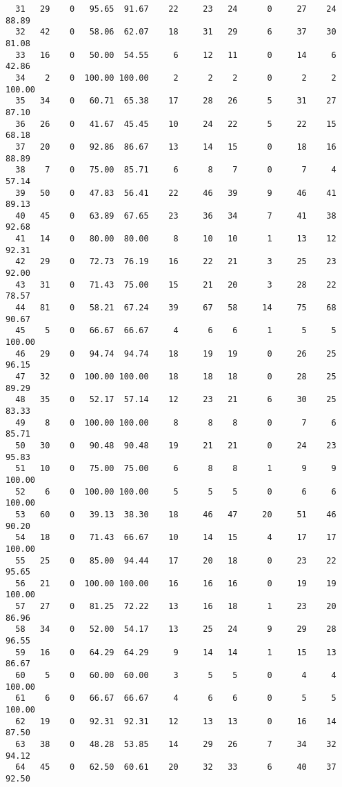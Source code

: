 \begin{verbatim}
  31   29    0   95.65  91.67    22     23   24      0     27    24    88.89
  32   42    0   58.06  62.07    18     31   29      6     37    30    81.08
  33   16    0   50.00  54.55     6     12   11      0     14     6    42.86
  34    2    0  100.00 100.00     2      2    2      0      2     2   100.00
  35   34    0   60.71  65.38    17     28   26      5     31    27    87.10
  36   26    0   41.67  45.45    10     24   22      5     22    15    68.18
  37   20    0   92.86  86.67    13     14   15      0     18    16    88.89
  38    7    0   75.00  85.71     6      8    7      0      7     4    57.14
  39   50    0   47.83  56.41    22     46   39      9     46    41    89.13
  40   45    0   63.89  67.65    23     36   34      7     41    38    92.68
  41   14    0   80.00  80.00     8     10   10      1     13    12    92.31
  42   29    0   72.73  76.19    16     22   21      3     25    23    92.00
  43   31    0   71.43  75.00    15     21   20      3     28    22    78.57
  44   81    0   58.21  67.24    39     67   58     14     75    68    90.67
  45    5    0   66.67  66.67     4      6    6      1      5     5   100.00
  46   29    0   94.74  94.74    18     19   19      0     26    25    96.15
  47   32    0  100.00 100.00    18     18   18      0     28    25    89.29
  48   35    0   52.17  57.14    12     23   21      6     30    25    83.33
  49    8    0  100.00 100.00     8      8    8      0      7     6    85.71
  50   30    0   90.48  90.48    19     21   21      0     24    23    95.83
  51   10    0   75.00  75.00     6      8    8      1      9     9   100.00
  52    6    0  100.00 100.00     5      5    5      0      6     6   100.00
  53   60    0   39.13  38.30    18     46   47     20     51    46    90.20
  54   18    0   71.43  66.67    10     14   15      4     17    17   100.00
  55   25    0   85.00  94.44    17     20   18      0     23    22    95.65
  56   21    0  100.00 100.00    16     16   16      0     19    19   100.00
  57   27    0   81.25  72.22    13     16   18      1     23    20    86.96
  58   34    0   52.00  54.17    13     25   24      9     29    28    96.55
  59   16    0   64.29  64.29     9     14   14      1     15    13    86.67
  60    5    0   60.00  60.00     3      5    5      0      4     4   100.00
  61    6    0   66.67  66.67     4      6    6      0      5     5   100.00
  62   19    0   92.31  92.31    12     13   13      0     16    14    87.50
  63   38    0   48.28  53.85    14     29   26      7     34    32    94.12
  64   45    0   62.50  60.61    20     32   33      6     40    37    92.50

\end{verbatim}
